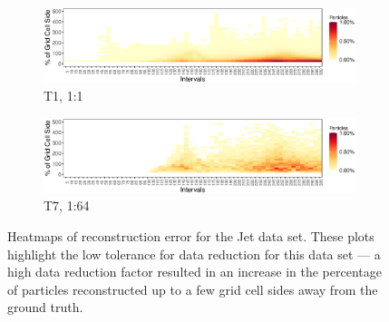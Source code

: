 \begin{figure}[!t]
\begin{subfigure}{\linewidth}
\centering
\includegraphics[width=\linewidth]{Images/Jet_Intervals_T1_Percent.eps}
\caption{T1, 1:1}
\label{fig:jet_1}
\end{subfigure}
\begin{subfigure}{\linewidth}
\centering
\includegraphics[width=\linewidth]{Images/Jet_Intervals_T7_Percent.eps}
\caption{T7, 1:64}
\label{fig:jet_7}
\end{subfigure}
\caption{Heatmaps of reconstruction error for the Jet data set. These plots highlight the low tolerance for data reduction for this data set --- a high data reduction factor resulted in an increase in the percentage of particles reconstructed up to a few grid cell sides away from the ground truth.}
\vspace{-5mm}
\label{fig:jet_map}
\end{figure}
